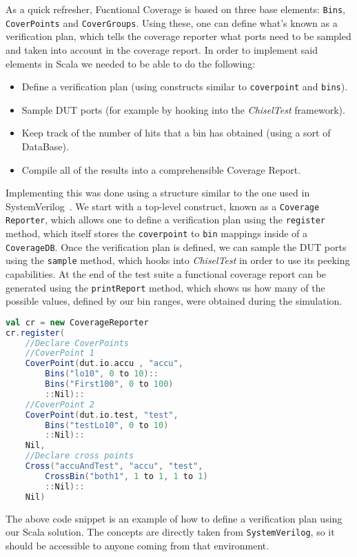 \documentclass[conference]{IEEEtran}
\begin{document}
As a quick refresher, Fucntional Coverage is based on three base elements: \texttt{Bins}, \texttt{CoverPoints} and \texttt{CoverGroups}. Using these, one can define what's known as a verification plan, which tells the coverage reporter what ports need to be sampled and taken into account in the coverage report.
In order to implement said elements in Scala we needed to be able to do the following:
\begin{itemize}
\item Define a verification plan (using constructs similar to \texttt{coverpoint} and \texttt{bins}).
\item Sample DUT ports (for example by hooking into the \textit{ChiselTest} framework).
\item Keep track of the number of hits that a bin has obtained (using a sort of DataBase).
\item Compile all of the results into a comprehensible Coverage Report.
\end{itemize}
Implementing this was done using a structure similar to the one used in SystemVerilog~\cite{spear2008systemverilog}. We start with a top-level construct, known as a \texttt{Coverage Reporter}, which allows one to define a verification plan using the \texttt{register} method, which itself stores the \texttt{coverpoint} to \texttt{bin} mappings inside of a \texttt{CoverageDB}. Once the verification plan is defined, we can sample the DUT ports using the \texttt{sample} method, which hooks into \textit{ChiselTest} in order to use its peeking capabilities. At the end of the test suite a functional coverage report can be generated using the \texttt{printReport} method, which shows us how many of the possible values, defined by our bin ranges, were obtained during the simulation.
\begin{lstlisting}[language=scala]
val cr = new CoverageReporter
cr.register(
    //Declare CoverPoints
    //CoverPoint 1
    CoverPoint(dut.io.accu , "accu",
        Bins("lo10", 0 to 10)::
        Bins("First100", 0 to 100)
        ::Nil)::
    //CoverPoint 2
    CoverPoint(dut.io.test, "test", 
        Bins("testLo10", 0 to 10)
        ::Nil)::
    Nil,
    //Declare cross points
    Cross("accuAndTest", "accu", "test",
        CrossBin("both1", 1 to 1, 1 to 1)
        ::Nil)::
    Nil)
\end{lstlisting}
The above code snippet is an example of how to define a verification plan using our Scala solution. The concepts are directly taken from \texttt{SystemVerilog}, so it should be accessible to anyone coming from that environment. 
\end{document}
